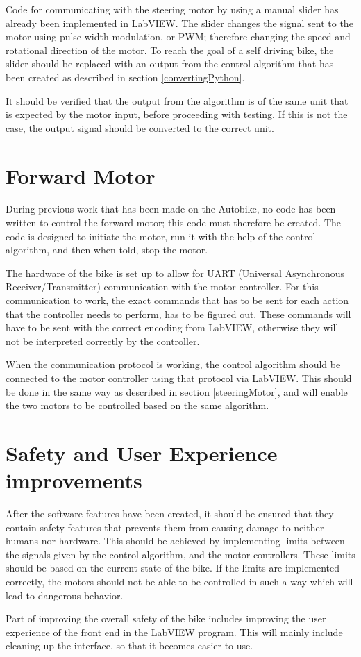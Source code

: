 Code for communicating with the steering motor by using a manual slider has already been implemented in LabVIEW. The slider changes the signal sent to the motor using pulse-width modulation, or PWM; therefore changing the speed and rotational direction of the motor. To reach the goal of a self driving bike, the slider should be replaced with an output from the control algorithm that has been created as described in section \ref{convertingPython}. 

It should be verified that the output from the algorithm is of the same unit that is expected by the motor input, before proceeding with testing. If this is not the case, the output signal should be converted to the correct unit.

\section{Forward Motor}

During previous work that has been made on the Autobike, no code has been written to control the forward motor; this code must therefore be created. The code is designed to initiate the motor, run it with the help of the control algorithm, and then when told, stop the motor.

The hardware of the bike is set up to allow for UART (Universal Asynchronous Receiver/Transmitter) communication with the motor controller. For this communication to work, the exact commands that has to be sent for each action that the controller needs to perform, has to be figured out. These commands will have to be sent with the correct encoding from LabVIEW, otherwise they will not be interpreted correctly by the controller.

When the communication protocol is working, the control algorithm should be connected to the motor controller using that protocol via LabVIEW. This should be done in the same way as described in section \ref{steeringMotor}, and will enable the two motors to be controlled based on the same algorithm.

\section{Safety and User Experience improvements}

After the software features have been created, it should be ensured that they contain safety features that prevents them from causing damage to neither humans nor hardware. This should be achieved by implementing limits between the signals given by the control algorithm, and the motor controllers. These limits should be based on the current state of the bike. If the limits are implemented correctly, the motors should not be able to be controlled in such a way which will lead to dangerous behavior.

Part of improving the overall safety of the bike includes improving the user experience of the front end in the LabVIEW program. This will mainly include cleaning up the interface, so that it becomes easier to use.
